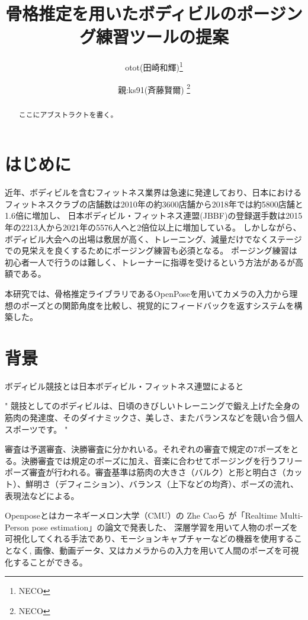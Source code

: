 \documentclass[a4j,10pt]{jsarticle}
\begin{document}

\title{骨格推定を用いたボディビルのポージング練習ツールの提案}

\author{
    otot(田崎和輝)\thanks{NECO}
    \and
    親:ks91(斉藤賢爾) \thanks{NECO}
}

\begin{abstract}
ここにアブストラクトを書く。
\end{abstract}

\maketitle
\thispagestyle{empty}

\section{はじめに}
近年、ボディビルを含むフィットネス業界は急速に発達しており、日本におけるフィットネスクラブの店舗数は2010年の約3600店舗から2018年では約5800店舗と1.6倍に増加し\cite{fitness}、
日本ボディビル・フィットネス連盟(JBBF)の登録選手数は2015年の2213人から2021年の5576人へと2倍位以上に増加している\cite{jbbf}。
しかしながら、ボディビル大会への出場は敷居が高く、トレーニング、減量だけでなくステージでの見栄えを良くするためにポージング練習も必須となる。
ポージング練習は初心者一人で行うのは難しく、トレーナーに指導を受けるという方法があるが高額である。

本研究では、骨格推定ライブラリであるOpenPoseを用いてカメラの入力から理想のポーズとの関節角度を比較し、視覚的にフィードバックを返すシステムを構築した。
\section{背景}
ボディビル競技とは日本ボディビル・フィットネス連盟によると

"
    競技としてのボディビルは、日頃のきびしいトレーニングで鍛え上げた全身の筋肉の発達度、そのダイナミックさ、美しさ、またバランスなどを競い合う個人スポーツです。\cite{bodybuilding}
"

審査は予選審査、決勝審査に分かれいる。それぞれの審査で規定の7ポーズをとる。決勝審査では規定のポーズに加え、音楽に合わせてポージングを行うフリーポーズ審査が行われる。審査基準は筋肉の大きさ（バルク）と形と明白さ（カット）、鮮明さ（デフィニション）、バランス（上下などの均斉）、ポーズの流れ、表現法などによる。

Openposeとはカーネギーメロン大学（CMU）の Zhe Caoら が「Realtime Multi-Person pose estimation」\cite{openpose}の論文で発表した、
深層学習を用いて人物のポーズを可視化してくれる手法であり、モーションキャプチャーなどの機器を使用することなく,
画像、動画データ、又はカメラからの入力を用いて人間のポーズを可視化することができる。
\end{document}
